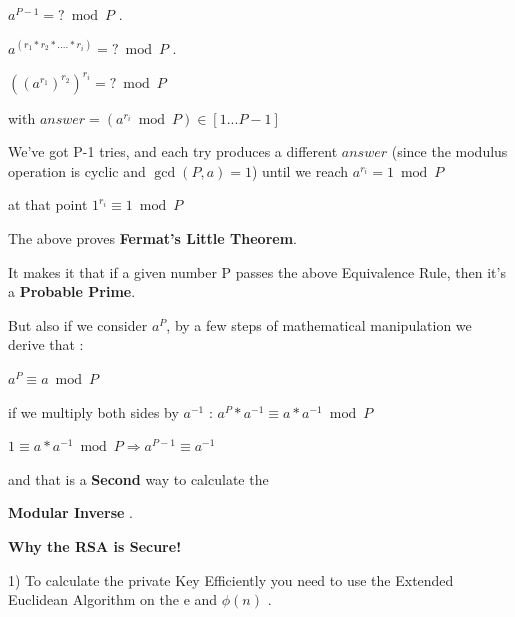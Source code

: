 \documentclass{slides}
\begin{document}
\begin{center}
$ a^{P-1}=?\bmod P $ .
\end{center}
\begin{center}
$ a^{(r_{1} * r_{2} *....* r_{i})}= ?\bmod P $ .
\end{center}
\begin{center}
$ ((a^{r_{1}})^{r_{2}})^{r_{i}} = ?\bmod P $
\end{center}
\begin{center}
with $ answer = (a^{r_{i}} \bmod P) \in [1...P-1] $
\end{center}
\begin{center}
We've got P-1 tries, and each try produces a different $ answer $ (since the modulus operation is cyclic and $ \gcd(P,a)=1 $) until we reach $ a^{r_{i}} = 1 \bmod P $
\end{center}
\begin{center}
at that point $ 1^{r_{i}} \equiv 1 \bmod P $
\end{center}
\begin{center}
The above proves \textbf{Fermat's Little Theorem}.
\end{center}
\begin{center}
It makes it that if a given number P passes the above Equivalence Rule, then it's a \textbf{Probable Prime}.
\end{center}
\begin{center}
But also if we consider $ a^{P} $, by a few steps of mathematical manipulation we derive that :
\end{center}
\begin{center}
$ a^{P} \equiv a \bmod P $
\end{center}
\begin{center}
if we multiply both sides by $ a^{-1} $ : $ a^{P}*a^{-1} \equiv a*a^{-1} \bmod P $
\end{center}
\begin{center}
$ 1 \equiv a*a^{-1} \bmod P \Rightarrow a^{P-1} \equiv a^{-1}$ 
\end{center}
\begin{center}
and that is a \textbf{Second} way to calculate the
\end{center}
\begin{center}
\textbf{Modular Inverse} .
\end{center}
\newpage

\newpage
\begin{center}
\textbf{Why the RSA is Secure!}
\end{center}
\begin{center}
1) To calculate the private Key Efficiently you need to use the Extended Euclidean Algorithm on the e and $ \phi(n) $ .
\end{center}
\end{document}
